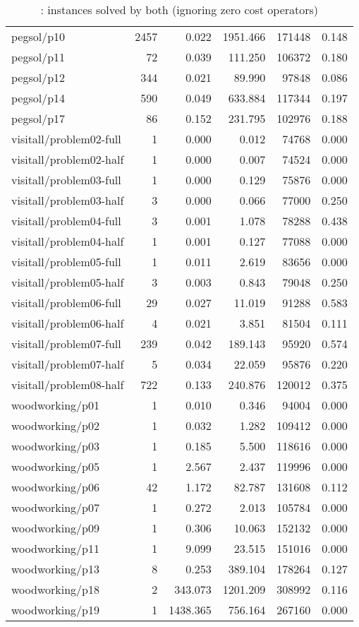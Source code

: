 \begin{table*}[ht]
\begin{tabular}{lrrrrr}
  pegsol/p10 & 2457 & 0.022 & 1951.466 & 171448 & 0.148 \\ 
  pegsol/p11 &   72 & 0.039 & 111.250 & 106372 & 0.180 \\ 
  pegsol/p12 &  344 & 0.021 & 89.990 & 97848 & 0.086 \\ 
  pegsol/p14 &  590 & 0.049 & 633.884 & 117344 & 0.197 \\ 
  pegsol/p17 &   86 & 0.152 & 231.795 & 102976 & 0.188 \\ 
  visitall/problem02-full &    1 & 0.000 & 0.012 & 74768 & 0.000 \\ 
  visitall/problem02-half &    1 & 0.000 & 0.007 & 74524 & 0.000 \\ 
  visitall/problem03-full &    1 & 0.000 & 0.129 & 75876 & 0.000 \\ 
  visitall/problem03-half &    3 & 0.000 & 0.066 & 77000 & 0.250 \\ 
  visitall/problem04-full &    3 & 0.001 & 1.078 & 78288 & 0.438 \\ 
  visitall/problem04-half &    1 & 0.001 & 0.127 & 77088 & 0.000 \\ 
  visitall/problem05-full &    1 & 0.011 & 2.619 & 83656 & 0.000 \\ 
  visitall/problem05-half &    3 & 0.003 & 0.843 & 79048 & 0.250 \\ 
  visitall/problem06-full &   29 & 0.027 & 11.019 & 91288 & 0.583 \\ 
  visitall/problem06-half &    4 & 0.021 & 3.851 & 81504 & 0.111 \\ 
  visitall/problem07-full &  239 & 0.042 & 189.143 & 95920 & 0.574 \\ 
  visitall/problem07-half &    5 & 0.034 & 22.059 & 95876 & 0.220 \\ 
  visitall/problem08-half &  722 & 0.133 & 240.876 & 120012 & 0.375 \\ 
  woodworking/p01 &    1 & 0.010 & 0.346 & 94004 & 0.000 \\ 
  woodworking/p02 &    1 & 0.032 & 1.282 & 109412 & 0.000 \\ 
  woodworking/p03 &    1 & 0.185 & 5.500 & 118616 & 0.000 \\ 
  woodworking/p05 &    1 & 2.567 & 2.437 & 119996 & 0.000 \\ 
  woodworking/p06 &   42 & 1.172 & 82.787 & 131608 & 0.112 \\ 
  woodworking/p07 &    1 & 0.272 & 2.013 & 105784 & 0.000 \\ 
  woodworking/p09 &    1 & 0.306 & 10.063 & 152132 & 0.000 \\ 
  woodworking/p11 &    1 & 9.099 & 23.515 & 151016 & 0.000 \\ 
  woodworking/p13 &    8 & 0.253 & 389.104 & 178264 & 0.127 \\ 
  woodworking/p18 &    2 & 343.073 & 1201.209 & 308992 & 0.116 \\ 
  woodworking/p19 &    1 & 1438.365 & 756.164 & 267160 & 0.000 \\ 
   \hline
\end{tabular}
\caption{\oursolver{}: instances solved by both (ignoring zero cost operators)} 
\label{tab:our_both_ignoring}
\end{table*}
